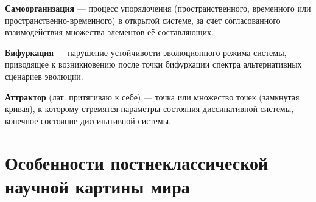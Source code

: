 \textbf{Самоорганизация} --- процесс упорядочения (пространственного, временного или пространственно-временного) в открытой системе, за счёт согласованного взаимодействия множества элементов её составляющих.

\textbf{Бифуркация} --- нарушение устойчивости эволюционного режима системы, приводящее к возникновению после точки бифуркации спектра альтернативных сценариев эволюции.

\textbf{Аттрактор} (лат. притягиваю к себе) --- точка или множество точек (замкнутая кривая), к которому стремятся параметры состояния диссипативной системы, конечное состояние диссипативной системы.

\section{Особенности постнеклассической научной картины мира}
